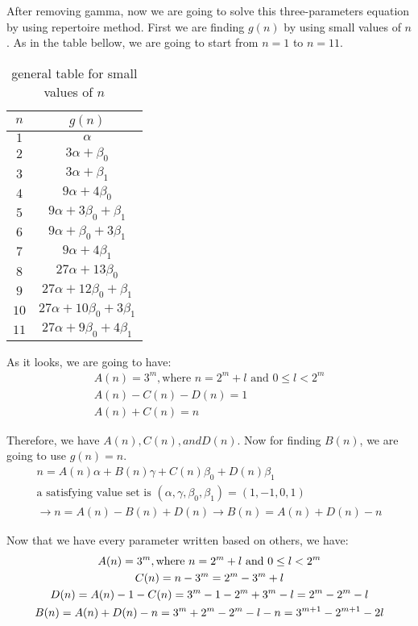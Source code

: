\documentclass[12pt]{article}
\begin{document}
After removing gamma, now we are going to solve this three-parameters equation by using repertoire method.
First we are finding $g(n)$ by using small values of $n$. As in the table bellow, we are going to start
from $n=1$ to $n=11$.
\begin{table}[H]
    \centering
    \begin{tabular}{c|c}
        $n$ & $g(n)$ \\
        \hline
        $1$ & $\alpha$ \\
        \hline
        $2$ & $3\alpha + \beta_{0}$ \\
        $3$ & $3\alpha + \beta_{1}$ \\
        \hline
        $4$ & $9\alpha + 4\beta_{0}$ \\
        $5$ & $9\alpha + 3\beta_{0} + \beta_{1}$ \\
        $6$ & $9\alpha + \beta_{0} + 3\beta_{1}$ \\
        $7$ & $9\alpha + 4\beta_{1}$ \\
        \hline
        $8$ & $27\alpha + 13\beta_{0}$ \\
        $9$ & $27\alpha + 12\beta_{0} + \beta_{1}$ \\
        $10$ & $27\alpha + 10\beta_{0} + 3\beta_{1}$ \\
        $11$ & $27\alpha + 9\beta_{0} + 4\beta_{1}$
    \end{tabular}
    \caption{general table for small values of $n$}
    \label{tab:sample}
\end{table}

As it looks, we are going to have:
\begin{gather*}
    A(n) = 3^m, \text{where } n = 2^m + l \text{ and } 0 \leq l < 2^m \\
    A(n) - C(n) - D(n) = 1 \\
    A(n) + C(n) = n
\end{gather*}

Therefore, we have $A(n), C(n), and D(n)$. Now for finding $B(n)$, we are going to use $g(n)=n$.
\begin{gather*}
    n = A(n) \alpha + B(n) \gamma + C(n) \beta_{0} + D(n) \beta_{1} \\
    \text{a satisfying value set is } (\alpha, \gamma, \beta_{0}, \beta_{1}) = (1, -1, 0, 1) \\
    \to n = A(n) - B(n) + D(n) \to B(n) = A(n) + D(n) - n
\end{gather*}

Now that we have every parameter written based on others, we have:
\begin{gather*}
    A(n) = 3^m, \text{where } n = 2^m + l \text{ and } 0 \leq l < 2^m \\
    C(n) = n - 3^m = 2^m - 3^m + l \\
    D(n) = A(n) - 1 - C(n) = 3^m - 1 - 2^m + 3^m - l = 2 \time 3^m - 2^m - l \\
    B(n) = A(n) + D(n) - n = 3^m + 2 \time 3^m - 2^m - l - n = 3^{m+1} - 2^{m+1} -2l
\end{gather*}
\end{document}

